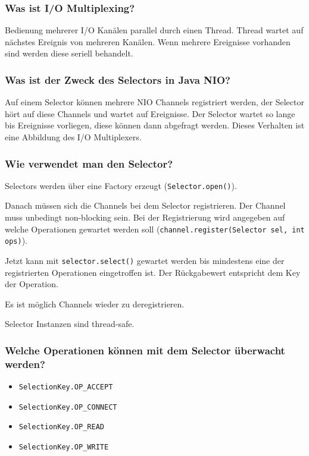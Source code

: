 \documentclass[10pt,a4paper]{scrartcl}
\begin{document}
\subsubsection{Was ist I/O Multiplexing?}

Bedienung mehrerer I/O Kanälen parallel durch einen Thread. Thread wartet auf nächstes Ereignis von
mehreren Kanälen. Wenn mehrere Ereignisse vorhanden sind werden diese seriell behandelt.
  
\subsubsection{Was ist der Zweck des Selectors in Java NIO?}

Auf einem Selector können mehrere NIO Channels registriert werden, der Selector hört auf diese
Channels und wartet auf Ereignisse. Der Selector wartet so lange bis Ereignisse vorliegen, diese
können dann abgefragt werden. Dieses Verhalten ist eine Abbildung des I/O Multiplexers.
  
\subsubsection{Wie verwendet man den Selector?}

Selectors werden über eine Factory erzeugt (\texttt{Selector.open()}).

Danach müssen sich die Channels bei dem Selector registrieren. Der Channel muss unbedingt
non-blocking sein. Bei der Registrierung wird angegeben auf welche Operationen gewartet werden soll
(\texttt{channel.register(Selector sel, int ops)}). 

Jetzt kann mit \texttt{selector.select()} gewartet werden bis mindestens eine der registrierten
Operationen eingetroffen ist. Der Rückgabewert entspricht dem Key der Operation.

Es ist möglich Channels wieder zu deregistrieren.

Selector Instanzen sind thread-safe.
  
\subsubsection{Welche Operationen können mit dem Selector überwacht werden?}

\begin{itemize}
	\item \texttt{SelectionKey.OP\_ACCEPT}
	\item \texttt{SelectionKey.OP\_CONNECT}
	\item \texttt{SelectionKey.OP\_READ}
	\item \texttt{SelectionKey.OP\_WRITE}
\end{itemize}
\end{document}
